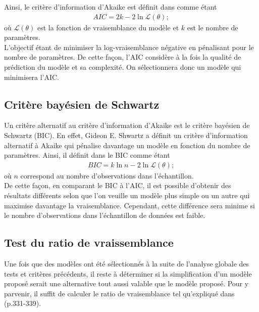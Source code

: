 	Ainsi, le critère d'information d'Akaike est définit dans \cite{Akaike_Criteria1974} comme étant
	\begin{align}
	AIC =  2k-2 \ln \mathcal{L}(\theta);
	\end{align}
	où $\mathcal{L}(\theta)$ est la fonction de vraisemblance du modèle et $k$ est le nombre de paramètres.\\
	
	L'objectif étant de minimiser la log-vraisemblance négative en pénalisant pour le nombre de paramètres. De cette façon, l'AIC considère à la fois la qualité de prédiction du modèle et sa complexité. On sélectionnera donc un modèle qui minimisera l'AIC.

\subsection{Critère bayésien de Schwartz}
	Un critère alternatif au critère d'information d'Akaike est le critère bayésien de Schwartz (BIC). En effet, Gideon E. Shwartz a définit un critère d'information alternatif à Akaike qui pénalise davantage un modèle en fonction du nombre de paramètres. Ainsi, il définit dans \cite{schwarz1978} le BIC comme étant 	
	\begin{align}
	BIC =  k\ln n - 2\ln \mathcal{L}(\theta);
	\end{align}
	où $n$ correspond au nombre d'observations dans l'échantillon.\\
	
	De cette façon, en comparant le BIC à l'AIC, il est possible d'obtenir des résultats différents selon que l'on veuille un modèle plus simple ou un autre qui maximise davantage la vraisemblance. Cependant, cette différence sera minime si le nombre d'observations dans l'échantillon de données est faible.
	
\subsection{Test du ratio de vraissemblance}
		Une fois que des modèles ont été sélectionnés à la suite de l'analyse globale des tests et critères précédents, il reste à déterminer si la simplification d'un modèle proposé serait une alternative tout aussi valable que le modèle proposé. Pour y parvenir, il suffit de calculer le ratio de vraisemblance tel qu'expliqué dans \cite{LossModels_Klugman2012}(p.331-339).
		

